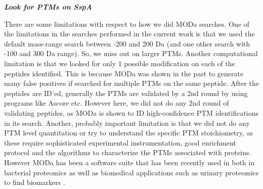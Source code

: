 \documentclass[12pt]{article}
\begin{document}




\textbf{\emph{Look for PTMs on SspA}}

There are some limitations with respect to how we did MODa searches. One of the limitations in the searches performed in the current work is that we used the default mass-range search between -200 and 200 Da (and one other search with -100 and 300 Da range). So, we miss out on larger PTMs. Another computational limitation is that we looked for only 1 possible modification on each of the peptides identified. This is because MODa was shown in the past to generate many false positives if searched for multiple PTMs on the same peptide. After the peptides are ID'ed, generally the PTMs are validated by a 2nd round by using programs like Ascore etc. However here, we did not do any 2nd round of validating peptides, as MODa is shown to ID high-confidence PTM identifications in its search. Another, probably important limitation is that we did not do any PTM level quantitation or try to understand the specific PTM stoichiometry, as these require sophisticated experimental instrumentation, good enrichment protocol and the algorithms to characterize the PTMs associated with proteins. However MODa has been a software suite that has been recently used in both in bacterial proteomics as well as biomedical applications such as urinary proteomics to find biomarkers \cite{Liuetal2013}.
\end{document}

